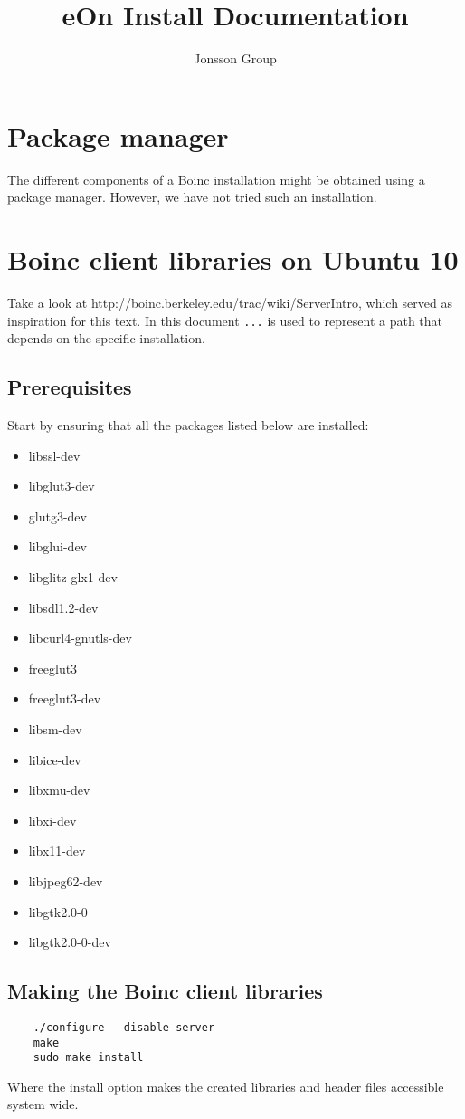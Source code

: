 \documentclass{article}
\begin{document}
\title{eOn Install Documentation}
\author{Jonsson	 Group}
\maketitle

\section{Package manager}
The different components of a Boinc installation might be obtained using a package manager.  However, we have not tried such an installation.

\section{Boinc client libraries on Ubuntu 10}
Take a look at http://boinc.berkeley.edu/trac/wiki/ServerIntro, which served as inspiration for this text. In this document \texttt{...} is used to represent a path that depends on the specific installation.
%
\subsection{Prerequisites}
Start by ensuring that all the packages listed below are installed:
\begin{itemize}
\item libssl-dev
\item libglut3-dev
\item glutg3-dev
\item libglui-dev
\item libglitz-glx1-dev
\item libsdl1.2-dev
\item libcurl4-gnutls-dev
\item freeglut3
\item freeglut3-dev
\item libsm-dev
\item libice-dev
\item libxmu-dev
\item libxi-dev
\item libx11-dev
\item libjpeg62-dev
\item libgtk2.0-0
\item libgtk2.0-0-dev
\end{itemize}
%
\subsection{Making the Boinc client libraries}
\begin{verbatim}
	./configure --disable-server
	make
	sudo make install
\end{verbatim}
Where the install option makes the created libraries and header files accessible system wide.
%
\end{document}
